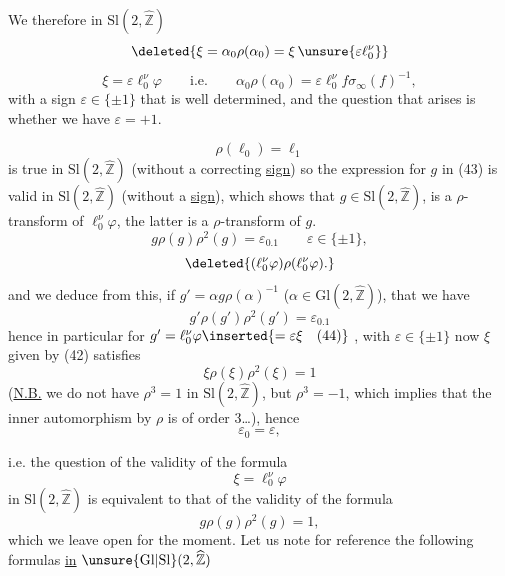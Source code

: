 We  therefore in $\mathrm{Sl}(2,\widehat{\mathbb Z})$
\[
 \deleted{\xi=\alpha_0\rho(\alpha_0)=\xi\,\unsure{\varepsilon\ell_0^\nu}}
\]
\[
 \xi=\varepsilon\ell_0^\nu\varphi
 \qquad\text{i.e.}\qquad
 \alpha_0\rho(\alpha_0)=\varepsilon\ell_0^\nu f\sigma_\infty(f)^{-1},
 \tag{44}
\]
with a sign $\varepsilon\in\{\pm1\}$ that is well determined, and the question that arises is whether we  have $\varepsilon=+1$.

\[
 \rho(\ell_0)=\ell_1
\]
is true in $\mathrm{Sl}(2,\widehat{\mathbb Z})$ (without a correcting \uline{sign}) so the  expression for $g$ in (43) is valid in $\mathrm{Sl}(2,\widehat{\mathbb Z})$ (without a \uline{sign}), which shows that $g\in\mathrm{Sl}(2,\widehat{\mathbb Z})$,  is a $\rho$-transform of $\ell_0^\nu\varphi$,  the latter is a $\rho$-transform of $g$.
\[
 g\rho(g)\rho^2(g)=\varepsilon_0.1
 \qquad\varepsilon\in\{\pm1\},
\]
\[
 \deleted{(\ell_0^\nu\varphi)\rho(\ell_0^\nu\varphi).}
\]
and  we deduce from this, if $g'=\alpha g\rho(\alpha)^{-1}$
\deleted{\unsure{$\rho^2\in$}} ($\alpha\in\mathrm{Gl}(2,\widehat{\mathbb Z})$), that we have
\[
 g'\rho(g')\rho^2(g')=\varepsilon_0.1
\]
hence in particular for $g'=\ell_0^\nu\varphi\inserted{=\varepsilon\xi\quad\text{(44)}}$ , with $\varepsilon\in\{\pm1\}$  now $\xi$ given by (42) satisfies
\[
 \xi\rho(\xi)\rho^2(\xi)=1
\]
(\uline{N.B.} we do not have $\rho^3=1$ in $\mathrm{Sl}(2,\widehat{\mathbb Z})$, but $\rho^3=-1$, which implies that the inner automorphism   by $\rho$ is of order 3\ldots), hence
\[
 \varepsilon_0=\varepsilon,
\]


i.e. the question of the validity of the formula
\[
 \xi=\ell_0^\nu\varphi
\]
in $\mathrm{Sl}(2,\widehat{\mathbb Z})$ is equivalent to that of the validity of the formula
\[
 g\rho(g)\rho^2(g)=1,
\]
which we leave open for the moment. Let us note for reference the following formulas \uline{in} \uline{$\unsure{\mathrm{Gl}|\mathrm{Sl}}(2,\widehat{\mathbb Z})$}

